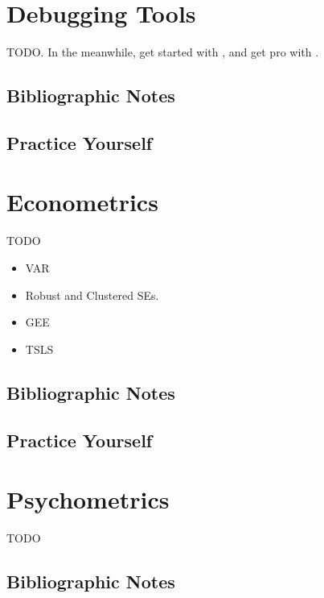 \documentclass[]{book}
\providecommand{\tightlist}{%
  \setlength{\itemsep}{0pt}\setlength{\parskip}{0pt}}
\theoremstyle{definition}
\theoremstyle{definition}
\theoremstyle{definition}
\theoremstyle{remark}
\begin{document}
\chapter{Debugging Tools}\label{debugging}

TODO. In the meanwhile, get started with \citet{wickham2011testthat},
and get pro with \citet{cotton2017testing}.

\section{Bibliographic Notes}\label{bibliographic-notes-17}

\section{Practice Yourself}\label{practice-yourself-16}

\chapter{Econometrics}\label{econometrics}

TODO

\begin{itemize}
\tightlist
\item
  VAR
\item
  Robust and Clustered SEs.
\item
  GEE
\item
  TSLS
\end{itemize}

\section{Bibliographic Notes}\label{bibliographic-notes-18}

\section{Practice Yourself}\label{practice-yourself-17}

\chapter{Psychometrics}\label{psychometrics}

TODO

\section{Bibliographic Notes}\label{bibliographic-notes-19}
\end{document}

